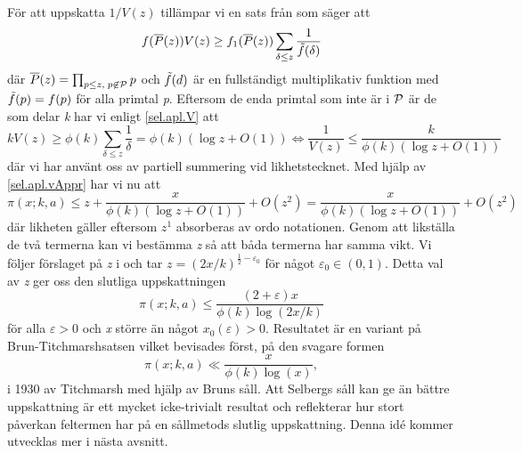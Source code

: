 För att uppskatta \(1/V(z)\) tillämpar vi en sats från \cite[Kap. 7]{cojocarumurty} som säger att
\begin{equation}
    f(\overline{P}(z))V(z) \geq f_1(\overline{P}(z))\sum_{\delta \leq z}\frac{1}{\Tilde{f}(\delta)}\label{sel.apl.V}
\end{equation}
där \(\overline{P}(z) = \prod_{p\leq z,\; p \not \in \P}p\) och \(\Tilde{f}(d)\) är en fullständigt multiplikativ funktion med \(\Tilde{f}(p) = f(p)\) för alla primtal \textit{p}. 
Eftersom de enda primtal som inte är i \(\P\) är de som delar \textit{k} har vi enligt \eqref{sel.apl.V} att 
\begin{equation}
    kV(z) \geq \phi(k) \sum_{\delta \leq z}\frac{1}{\delta} = \phi(k)(\log z + O(1)) \iff \frac{1}{V(z)} \leq \frac{k}{\phi(k)(\log z + O(1))}\label{sel.apl.vAppr}
\end{equation}
där vi har använt oss av partiell summering vid likhetstecknet. 
Med hjälp av \eqref{sel.apl.vAppr} har vi nu att
\begin{equation}
     \pi(x;k,a) \leq z + \frac{x}{\phi(k)(\log z + O(1))} + O(z^2) = \frac{x}{\phi(k)(\log z + O(1))} + O(z^2)\nonumber
\end{equation}
där likheten gäller eftersom \(z^1\) absorberas av ordo notationen. 
Genom att likställa de två termerna kan vi bestämma \textit{z} så att båda termerna har samma vikt. Vi följer förslaget på \textit{z} i \cite{cojocarumurty} och tar \(z = (2x/k)^{\frac{1}{2}-\varepsilon_0}\) för något \(\varepsilon_0\in(0, 1)\). Detta val av \textit{z} ger oss den slutliga uppskattningen
\begin{equation}
    \pi(x;k,a) \leq \frac{(2+\varepsilon)x}{\phi(k)\log(2x/k)}\nonumber
\end{equation}
för alla \(\varepsilon > 0\) och \textit{x} större än något \(x_0(\varepsilon) >0\). 
Resultatet är en variant på Brun-Titchmarshsatsen vilket bevisades först, på den svagare formen
\begin{equation}
    \pi(x;k,a)\ll \frac{x}{\phi(k)\log(x)},\nonumber
\end{equation}
i 1930 av Titchmarsh \cite{BrunTitch} med hjälp av Bruns såll. 
Att Selbergs såll kan ge än bättre uppskattning är ett mycket icke-trivialt resultat och reflekterar hur stort påverkan feltermen har på en sållmetods slutlig uppskattning.
Denna idé kommer utvecklas mer i nästa avsnitt.